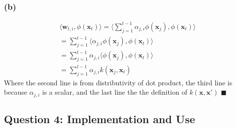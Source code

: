 \documentclass[11pt, oneside]{article}   	%
\begin{document}
\newpage{}
\subsubsection{(b)}
\begin{gather*}
\langle \boldsymbol{w}_{t, i}, \phi(\boldsymbol{x}_t) \rangle = \langle \sum_{j = 1}^{t-1}\alpha_{j, i}\phi(\boldsymbol{x}_j), \phi(\boldsymbol{x}_t) \rangle\\
= \sum_{j = 1}^{t-1} \langle \alpha_{j, i}\phi(\boldsymbol{x}_j), \phi(\boldsymbol{x}_t) \rangle\\
= \sum_{j = 1}^{t-1} \alpha_{j, i} \langle \phi(\boldsymbol{x}_j), \phi(\boldsymbol{x}_t) \rangle\\
= \sum_{j = 1}^{t-1} \alpha_{j, i} k(\boldsymbol{x}_j, \boldsymbol{x}_t)
\end{gather*}
Where the second line is from distributivity of dot product, the third line is because $\alpha_{j, i}$ is a scalar, and the last line the the definition of $k(\boldsymbol{x}, \boldsymbol{x'})$ $\blacksquare$
\newpage{}
\subsection{Question 4: Implementation and Use}
\end{document}
